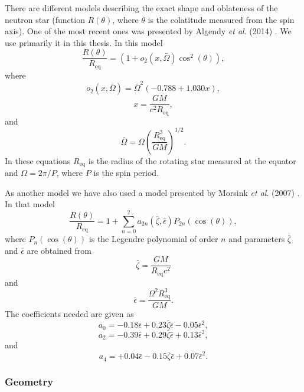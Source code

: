 \documentclass{wihuri}
\def\be{\begin{equation}}
\def\ee{\end{equation}}
\def\req{R_{\mathrm{eq}}}
\begin{document}
There are different models describing the exact shape and oblateness of the neutron star (function $R(\theta)$, where $\theta$ is the colatitude measured from the spin axis).
One of the most recent ones was presented by Algendy {\it et al}. (2014) \cite{algendy}. 
We use primarily it in this thesis. In this model %
\begin{equation}
\label{rtheta2}
\frac{R(\theta)}{\req} = (1 + o_{2}(x,\bar{\Omega})\cos^{2}(\theta)),
\end{equation}
where
\begin{equation}
\label{otwo}
o_{2}(x,\bar{\Omega}) = \bar{\Omega}^{2}(-0.788+1.030x),
\end{equation}
\begin{equation}
\label{rtheta2x}
x = \frac{GM}{c^{2}\req},
\end{equation}
and
\begin{equation}
\label{rtheta2omega}
\bar{\Omega} = \Omega \left(\frac{\req^{3}}{GM} \right)^{1/2}.
\end{equation}
In these equations $\req$ is the radius of the rotating star measured at the equator and $\Omega = 2\pi/P$, where $P$ is the spin period. %

As another model %
we have also used a model presented by Morsink {\it et al}. (2007) \cite{morsink}. In that model
\be\label{eq:rtheta}
\frac{R(\theta)}{\req} = 1 + \sum\limits_{n=0}^2 a_{2n}(\bar{\zeta},\bar{\epsilon})P_{2n}(\cos(\theta)), 
\ee
where $P_{n}(\cos(\theta))$ is the Legendre polynomial of order $n$ and parameters $\bar{\zeta}$ and $\bar{\epsilon}$ are obtained from
\be\label{eq:parzeta}
\bar{\zeta} = \frac{GM}{\req c^{2}}
\ee
and
\be\label{eq:parepsilon}
\bar{\epsilon} = \frac{\Omega^{2}\req^{3}}{GM}.
\ee
The coefficients needed are given as
\be\label{eq:azero}
a_{0} = -0.18\bar{\epsilon}+0.23\bar{\zeta}\bar{\epsilon}-0.05\bar{\epsilon}^{2}, 
\ee
\be\label{eq:atwo}
a_{2} = -0.39\bar{\epsilon}+0.29\bar{\zeta}\bar{\epsilon}+0.13\bar{\epsilon}^{2},
\ee
and
\be\label{eq:afour}
a_{4} = +0.04\bar{\epsilon}-0.15\bar{\zeta}\bar{\epsilon}+0.07\bar{\epsilon}^{2}.
\ee


\subsubsection{Geometry}
\end{document}
